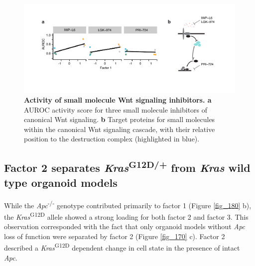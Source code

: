 \begin{flushleft}
\begin{figure}[h!]
\centering
\includegraphics[scale=0.75,keepaspectratio]{figures/adenomaprofiling/pdf/fig_2_2_1.pdf}
\caption[Activity of small molecule Wnt signaling inhibitors]{\textbf{Activity of small molecule Wnt signaling inhibitors. a} AUROC activity score for three small molecule inhibitors of canonical Wnt signaling. \textbf{b} Target proteins for small molecules within the canonical Wnt signaling cascade, with their relative position to the destruction complex (highlighted in blue).}
\label{fig_199}
\end{figure}

\newpage
\clearpage
\subsection{Factor 2 separates \textit{Kras}\textsuperscript{G12D/+} from \textit{Kras} wild type organoid models}
While the \textit{Apc}\textsuperscript{-/-}  genotype contributed primarily to factor 1 (Figure \ref{fig_180} b), the \textit{Kras}\textsuperscript{G12D} allele showed a strong loading for both factor 2 and factor 3. This observation corresponded with the fact that only organoid models without \textit{Apc} loss of function were separated by factor 2 (Figure \ref{fig_170} c). Factor 2 described a \textit{Kras}\textsuperscript{G12D} dependent change in cell state in the presence of intact \textit{Apc}.



\end{flushleft}

